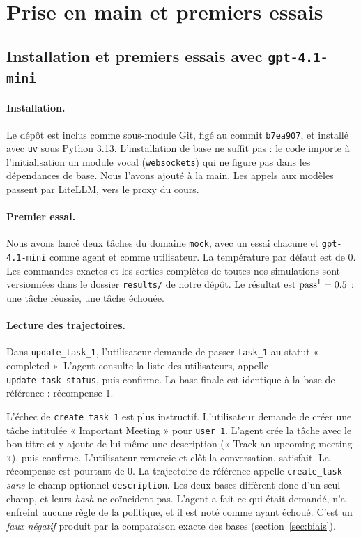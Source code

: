 \section{Prise en main et premiers essais}
\label{sec:prise-en-main}

\subsection{Installation et premiers essais avec \texttt{gpt-4.1-mini}}

\paragraph{Installation.} Le dépôt \taub{} est inclus comme sous-module Git, figé au commit \texttt{b7ea907}, et installé avec \texttt{uv} sous Python 3.13. L'installation de base ne suffit pas : le code importe à l'initialisation un module vocal (\texttt{websockets}) qui ne figure pas dans les dépendances de base. Nous l'avons ajouté à la main. Les appels aux modèles passent par LiteLLM, vers le proxy du cours.

\paragraph{Premier essai.} Nous avons lancé deux tâches du domaine \texttt{mock}, avec un essai chacune et \texttt{gpt-4.1-mini} comme agent et comme utilisateur. La température par défaut est de 0. Les commandes exactes et les sorties complètes de toutes nos simulations sont versionnées dans le dossier \texttt{results/} de notre dépôt. Le résultat est $\text{pass}^{1} = 0.5$ : une tâche réussie, une tâche échouée.

\paragraph{Lecture des trajectoires.} Dans \texttt{update\_task\_1}, l'utilisateur demande de passer \texttt{task\_1} au statut « completed ». L'agent consulte la liste des utilisateurs, appelle \texttt{update\_task\_status}, puis confirme. La base finale est identique à la base de référence : récompense 1.

L'échec de \texttt{create\_task\_1} est plus instructif. L'utilisateur demande de créer une tâche intitulée « Important Meeting » pour \texttt{user\_1}. L'agent crée la tâche avec le bon titre et y ajoute de lui-même une description (« Track an upcoming meeting »), puis confirme. L'utilisateur remercie et clôt la conversation, satisfait. La récompense est pourtant de 0. La trajectoire de référence appelle \texttt{create\_task} \emph{sans} le champ optionnel \texttt{description}. Les deux bases diffèrent donc d'un seul champ, et leurs \emph{hash} ne coïncident pas. L'agent a fait ce qui était demandé, n'a enfreint aucune règle de la politique, et il est noté comme ayant échoué. C'est un \emph{faux négatif} produit par la comparaison exacte des bases (section~\ref{sec:biais}).

